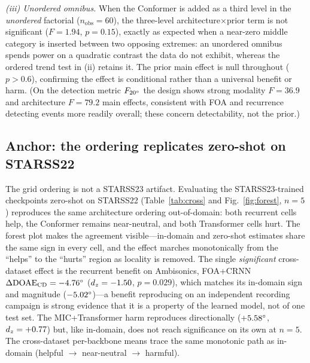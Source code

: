 \emph{(iii) Unordered omnibus.} When the Conformer is added as a third level in the
\emph{unordered} factorial ($n_{\text{obs}}=60$), the three-level
architecture$\times$prior term is not significant ($F=1.94$, $p=0.15$), exactly as
expected when a near-zero middle category is inserted between two opposing extremes:
an unordered omnibus spends power on a quadratic contrast the data do not exhibit,
whereas the ordered trend test in (ii) retains it. The prior main effect is null
throughout ($p>0.6$), confirming the effect is conditional rather than a universal
benefit or harm. (On the detection metric $F_{20^\circ}$ the design shows strong
modality $F=36.9$ and architecture $F=79.2$ main effects, consistent with FOA and
recurrence detecting events more readily overall; these concern detectability, not
the prior.)

\subsection{Anchor: the ordering replicates zero-shot on STARSS22}
\label{sec:cross}
The grid ordering is not a STARSS23 artifact. Evaluating the STARSS23-trained
checkpoints zero-shot on STARSS22 (Table~\ref{tab:cross} and
Fig.~\ref{fig:forest}, $n=5$) reproduces the same architecture ordering
out-of-domain: both recurrent cells help, the Conformer remains near-neutral,
and both Transformer cells hurt. The forest plot makes the agreement
visible---in-domain and zero-shot estimates share the same sign in every cell,
and the effect marches monotonically from the ``helps'' to the ``hurts'' region
as locality is removed. The single
\emph{significant} cross-dataset effect is the recurrent benefit on Ambisonics,
FOA+CRNN $\Delta\text{DOAE}_\mathrm{CD}=-4.76^\circ$ ($d_z=-1.50$, $p=0.029$),
which matches its in-domain sign and magnitude ($-5.02^\circ$)---a benefit
reproducing on an independent recording campaign is strong evidence that it is a
property of the learned model, not of one test set. The MIC+Transformer harm
reproduces directionally ($+5.58^\circ$, $d_z=+0.77$) but, like in-domain, does
not reach significance on its own at $n=5$. The cross-dataset per-backbone means
trace the same monotonic path as in-domain (helpful $\to$ near-neutral $\to$ harmful).

